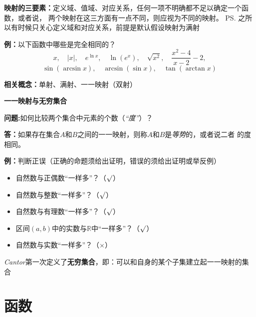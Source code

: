 {\bf 映射的三要素：}定义域、值域、对应关系，任何一项不明确都不足以确定一个函数，或者说，
两个映射在这三方面有一点不同，则应视为不同的映射。
\ps{之所以有时候只关心定义域和对应关系，前提是默认假设映射为满射}

{{\bf 例：}以下函数中哪些是完全相同的？}
		$$x,\quad |x|,\quad e^{\ln x},\quad \ln(e^x),\quad \sqrt{x^2},\quad
		\frac{x^2-4}{x-2}-2,$$
		$$\sin(\arcsin x),\quad \arcsin(\sin x), \quad \tan(\arctan x)$$

{\bf 相关概念：}单射、满射、一一映射（双射）

\begin{shaded}
	{\bf 一一映射与无穷集合}
	
	{\bf 问题:}如何比较两个集合中元素的个数（{\it “度”}）？
	
	{\bf 答：}如果存在集合$A$和$B$之间的一一映射，则称$A$和$B$是{\it 等势}的，或者说二者
	的度相同。
	
	{\bf 例：}判断正误（正确的命题须给出证明，错误的须给出证明或举反例）
	\begin{itemize}
	  \setlength{\itemindent}{1cm}
	  \item 自然数与正偶数“一样多”？（{$\surd$}）
	  \item 自然数与整数“一样多”？（{$\surd$}）
	  \item 自然数与有理数“一样多”？（{$\surd$}）
	  \item 区间$(a,b)$中的实数与$\mathbb{R}$中“一样多”？（{$\surd$}）
	  \item 自然数与实数“一样多”？（{$\times$}）
	\end{itemize}
		
	{\it Cantor}第一次定义了{\b{\bf 无穷集合}，即：可以和自身的某个子集建立起一一映射的集合}
\end{shaded}	

	
\section{函数}
	
